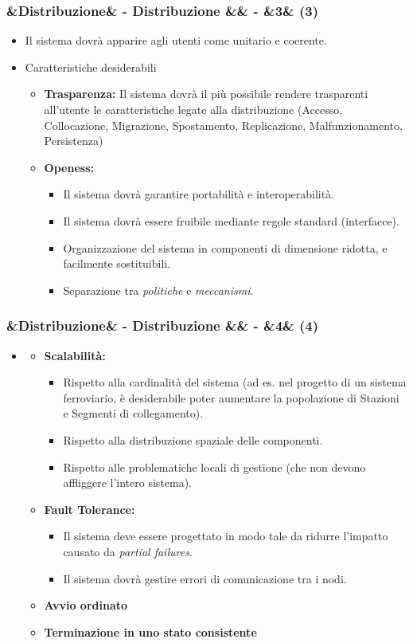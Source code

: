 \documentclass[slidestop,compress,blackandwhite]{beamer}
\newcommand{\itemB}[3]{
	\item \textbf{#1} #2 \vspace{#3}
}
\newcommand{\ii}[1]{\textit{#1}}
\newcommand{\cm}[1]{\vspace{#1cm}}
\newcommand{\newtitle}[4]{
	#1 
	\ifx&#2&%
	\else
  		\large- #2
	\fi
	\ifx&#3&%
	\else
  		\normalsize- #3
	\fi
	\ifx&#4&%
	\else
  		\normalsize (#4)
	\fi
}
\newcommand{\newframe}[5]{
	\begin{frame}
		\frametitle{\newtitle{#1}{#2}{#3}{#4}}
		#5
	\end{frame}
}
\newcommand{\myitemize}[1]{
	\begin{itemize}\itemsep4pt
	#1
	\end{itemize}
}
\begin{document}
	
	\newframe{}{Distribuzione}{}{3}{
		\myitemize {
			\item Il sistema dovrà apparire agli utenti come unitario e coerente. 
			\item Caratteristiche desiderabili
				\myitemize {
					\itemB{Trasparenza:}{Il sistema dovrà il più possibile rendere trasparenti all'utente le caratteristiche legate alla distribuzione (Accesso, Collocazione, Migrazione, Spostamento, Replicazione, Malfunzionamento, Persistenza)}{0.1cm}
					\itemB{Openess:}{\justifying
						\myitemize {
							\item Il sistema dovrà garantire portabilità e interoperabilità.
							\item Il sistema dovrà essere fruibile mediante regole standard (interfacce).
							\item \justifying Organizzazione del sistema in componenti di dimensione ridotta, e facilmente sostituibili.
							\item Separazione tra \ii{politiche} e \ii{meccanismi}.
						}
					}{0.1cm}
				}
		}
	}
	
	\newframe{}{Distribuzione}{}{4}{
		\myitemize {
			\item[]
				\myitemize {
					\itemB{Scalabilità:}{\justifying
						\myitemize {
							\item Rispetto alla cardinalità del sistema (ad es. nel progetto di un sistema ferroviario, è desiderabile poter aumentare la popolazione di Stazioni e Segmenti di collegamento).
							\item Rispetto alla distribuzione spaziale delle componenti.
							\item Rispetto alle problematiche locali di gestione (che non devono affliggere l'intero sistema).
						}
					}{0cm}
					\itemB{Fault Tolerance:}{
						\myitemize{
							\item Il sistema deve essere progettato in modo tale da ridurre l'impatto causato da \ii{partial failures}.
							\item Il sistema dovrà gestire errori di comunicazione tra i nodi.
						}
					}{0cm}
					\itemB{Avvio ordinato}{}{0cm}
					\itemB{Terminazione in uno stato consistente}{}{0cm}
				}
		}
	}
%	
%					
%				
	
\end{document}

